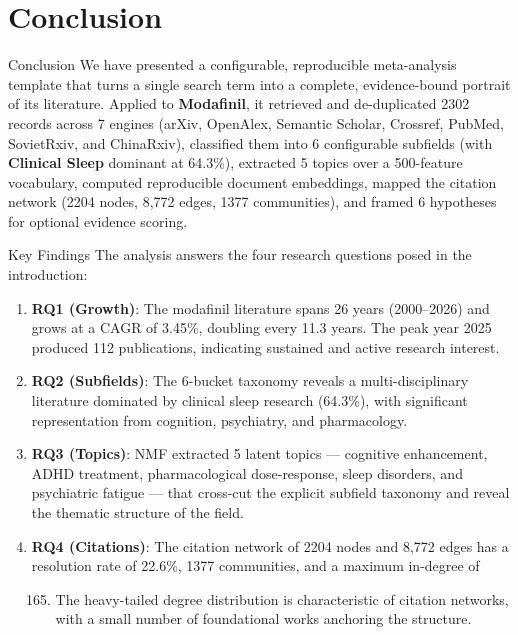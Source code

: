 \documentclass[
  ignorenonframetext,
]{beamer}
\author{\texorpdfstring{}{}}
\date{}
\providecommand{\tightlist}{%
  \setlength{\itemsep}{0pt}\setlength{\parskip}{0pt}}
\begin{document}
\section{Conclusion}\label{conclusion}

\begin{frame}[allowframebreaks]{Conclusion}
We have presented a configurable, reproducible meta-analysis template
that turns a single search term into a complete, evidence-bound portrait
of its literature. Applied to \textbf{Modafinil}, it retrieved and
de-duplicated 2302 records across 7 engines (arXiv, OpenAlex, Semantic
Scholar, Crossref, PubMed, SovietRxiv, and ChinaRxiv), classified them
into 6 configurable subfields (with \textbf{Clinical Sleep} dominant at
64.3\%), extracted 5 topics over a 500-feature vocabulary, computed
reproducible document embeddings, mapped the citation network (2204
nodes, 8,772 edges, 1377 communities), and framed 6 hypotheses for
optional evidence scoring.
\end{frame}

\begin{frame}[allowframebreaks]{Key Findings}
\protect{}\label{key-findings}
The analysis answers the four research questions posed in the
introduction:

\begin{enumerate}
\item
  \textbf{RQ1 (Growth)}: The modafinil literature spans 26 years
  (2000--2026) and grows at a CAGR of 3.45\%, doubling every 11.3 years.
  The peak year 2025 produced 112 publications, indicating sustained and
  active research interest.
\item
  \textbf{RQ2 (Subfields)}: The 6-bucket taxonomy reveals a
  multi-disciplinary literature dominated by clinical sleep research
  (64.3\%), with significant representation from cognition, psychiatry,
  and pharmacology.
\item
  \textbf{RQ3 (Topics)}: NMF extracted 5 latent topics --- cognitive
  enhancement, ADHD treatment, pharmacological dose-response, sleep
  disorders, and psychiatric fatigue --- that cross-cut the explicit
  subfield taxonomy and reveal the thematic structure of the field.
\item
  \textbf{RQ4 (Citations)}: The citation network of 2204 nodes and 8,772
  edges has a resolution rate of 22.6\%, 1377 communities, and a maximum
  in-degree of

  \begin{enumerate}
  \setcounter{enumii}{164}
  \tightlist
  \item
    The heavy-tailed degree distribution is characteristic of citation
    networks, with a small number of foundational works anchoring the
    structure.
  \end{enumerate}
\end{enumerate}
\end{frame}
\end{document}
